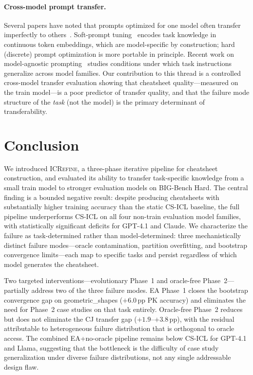 \paragraph{Cross-model prompt transfer.}
Several papers have noted that prompts optimized for one model often transfer imperfectly to
others~\citep{lester2021power,logan2021cutting}.
Soft-prompt tuning~\citep{lester2021power} encodes task knowledge in continuous token
embeddings, which are model-specific by construction; hard (discrete) prompt optimization
\citep{ape2022,opro2023} is more portable in principle.
Recent work on model-agnostic prompting~\citep{chen2023modelagnostic} studies conditions
under which task instructions generalize across model families.
Our contribution to this thread is a controlled cross-model transfer evaluation showing that
cheatsheet quality---measured on the train model---is a poor predictor of transfer quality,
and that the failure mode structure of the \emph{task} (not the model) is the primary
determinant of transferability.


\section{Conclusion}
\label{sec:conclusion}

We introduced \textsc{ICRefine}, a three-phase iterative pipeline for cheatsheet
construction, and evaluated its ability to transfer task-specific knowledge from a small
train model to stronger evaluation models on BIG-Bench Hard.
The central finding is a bounded negative result: despite producing cheatsheets with
substantially higher training accuracy than the static CS-ICL baseline, the full pipeline
underperforms CS-ICL on all four non-train evaluation model families, with statistically
significant deficits for GPT-4.1 and Claude.
We characterize the failure as task-determined rather than model-determined: three
mechanistically distinct failure modes---oracle contamination, partition overfitting, and
bootstrap convergence limits---each map to specific tasks and persist regardless of which
model generates the cheatsheet.

Two targeted interventions---evolutionary Phase~1 and oracle-free Phase~2---partially
address two of the three failure modes.
EA Phase~1 closes the bootstrap convergence gap on geometric\_shapes ($+6.0$\,pp PK
accuracy) and eliminates the need for Phase~2 case studies on that task entirely.
Oracle-free Phase~2 reduces but does not eliminate the CJ transfer gap ($+1.9$--$+3.8$\,pp),
with the residual attributable to heterogeneous failure distribution that is orthogonal to
oracle access.
The combined EA+no-oracle pipeline remains below CS-ICL for GPT-4.1 and Llama, suggesting
that the bottleneck is the difficulty of case study generalization under diverse failure
distributions, not any single addressable design flaw.

